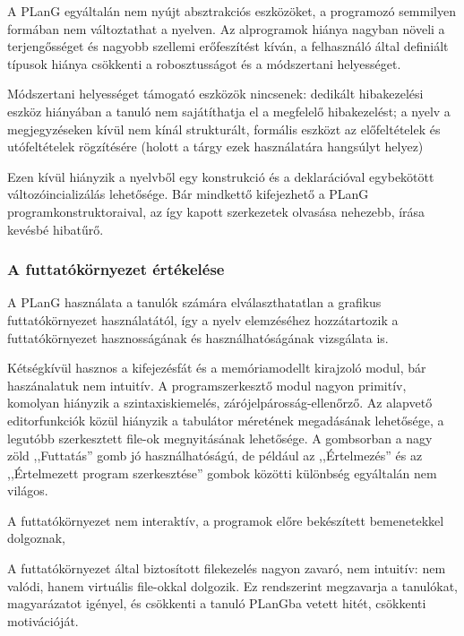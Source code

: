 A PLanG egyáltalán nem nyújt absztrakciós eszközöket, a programozó semmilyen formában nem változtathat a nyelven.
Az alprogramok hiánya nagyban növeli a terjengősséget és nagyobb szellemi erőfeszítést kíván, a felhasználó által definiált típusok hiánya csökkenti a robosztusságot és a módszertani helyességet.

Módszertani helyességet támogató eszközök nincsenek: dedikált hibakezelési eszköz hiányában a tanuló nem sajátíthatja el a megfelelő hibakezelést; a nyelv a megjegyzéseken kívül nem kínál strukturált, formális eszközt az előfeltételek és utófeltételek rögzítésére (holott a tárgy ezek használatára hangsúlyt helyez)

Ezen kívül hiányzik a nyelvből egy  konstrukció és a deklarációval egybekötött változóincializálás lehetősége. Bár mindkettő kifejezhető a PLanG programkonstruktoraival, az így kapott szerkezetek olvasása nehezebb, írása kevésbé hibatűrő.


\subsubsection{A futtatókörnyezet értékelése}
A PLanG használata a tanulók számára elválaszthatatlan a grafikus futtatókörnyezet használatától, így a nyelv elemzéséhez hozzátartozik a futtatókörnyezet hasznosságának és használhatóságának vizsgálata is.

Kétségkívül hasznos a kifejezésfát és a memóriamodellt kirajzoló modul, bár haszánalatuk nem intuitív.
A programszerkesztő modul nagyon primitív, komolyan hiányzik a szintaxiskiemelés, zárójelpárosság-ellenőrző.
Az alapvető editorfunkciók közül hiányzik a tabulátor méretének megadásának lehetősége, a legutóbb szerkesztett file-ok megnyitásának lehetősége.
A gombsorban a nagy zöld ,,Futtatás'' gomb jó használhatóságú, de például az ,,Értelmezés'' és az ,,Értelmezett program szerkesztése'' gombok közötti különbség egyáltalán nem világos.

A futtatókörnyezet nem interaktív, a programok előre bekészített bemenetekkel dolgoznak,

A futtatókörnyezet által biztosított filekezelés nagyon zavaró, nem intuitív: nem valódi, hanem virtuális file-okkal dolgozik.
Ez rendszerint megzavarja a tanulókat, magyarázatot igényel, és csökkenti a tanuló PLanGba vetett hitét, csökkenti motivációját.


